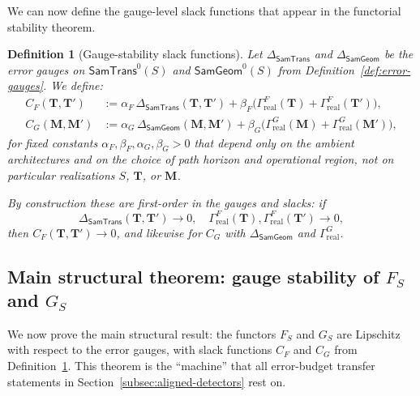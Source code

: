 \documentclass[11pt]{article}
\newtheorem{definition}{Definition}
\newcommand{\SamTrans}{\mathsf{SamTrans}}
\newcommand{\SamGeom}{\mathsf{SamGeom}}
\begin{document}
We can now define the gauge-level slack functions that appear in the
functorial stability theorem.

\begin{definition}[Gauge-stability slack functions]
\label{def:gauge-slacks}
Let $\Delta_{\SamTrans}$ and $\Delta_{\SamGeom}$ be the error gauges on
$\SamTrans^0(S)$ and $\SamGeom^0(S)$ from
Definition~\ref{def:error-gauges}. We define:
\begin{align}
C_F(\mathbf{T},\mathbf{T}')
&:=
\alpha_F\, \Delta_{\SamTrans}(\mathbf{T},\mathbf{T}')
+ \beta_F
\bigl(
\Gamma_{\mathrm{real}}^{F}(\mathbf{T}) +
\Gamma_{\mathrm{real}}^{F}(\mathbf{T}')
\bigr),
\label{eq:CF-def}
\\[0.3em]
C_G(\mathbf{M},\mathbf{M}')
&:=
\alpha_G\, \Delta_{\SamGeom}(\mathbf{M},\mathbf{M}')
+ \beta_G
\bigl(
\Gamma_{\mathrm{real}}^{G}(\mathbf{M}) +
\Gamma_{\mathrm{real}}^{G}(\mathbf{M}')
\bigr),
\label{eq:CG-def}
\end{align}
for fixed constants $\alpha_F,\beta_F,\alpha_G,\beta_G > 0$ that depend
only on the ambient architectures and on the choice of path horizon and
operational region, not on particular realizations $S$, $\mathbf{T}$, or
$\mathbf{M}$.

By construction these are \emph{first-order} in the gauges and slacks:
if
\[
\Delta_{\SamTrans}(\mathbf{T},\mathbf{T}') \to 0,\quad
\Gamma_{\mathrm{real}}^{F}(\mathbf{T}),\Gamma_{\mathrm{real}}^{F}(\mathbf{T}')
\to 0,
\]
then $C_F(\mathbf{T},\mathbf{T}') \to 0$, and likewise for $C_G$ with
$\Delta_{\SamGeom}$ and $\Gamma_{\mathrm{real}}^{G}$.
\end{definition}

\subsection{Main structural theorem: gauge stability of $F_S$ and $G_S$}
\label{subsec:gauge-stability}

We now prove the main structural result: the functors $F_S$ and $G_S$
are Lipschitz with respect to the error gauges, with slack functions
$C_F$ and $C_G$ from Definition~\ref{def:gauge-slacks}. This theorem is
the ``machine'' that all error-budget transfer statements in
Section~\ref{subsec:aligned-detectors} rest on.
\end{document}
